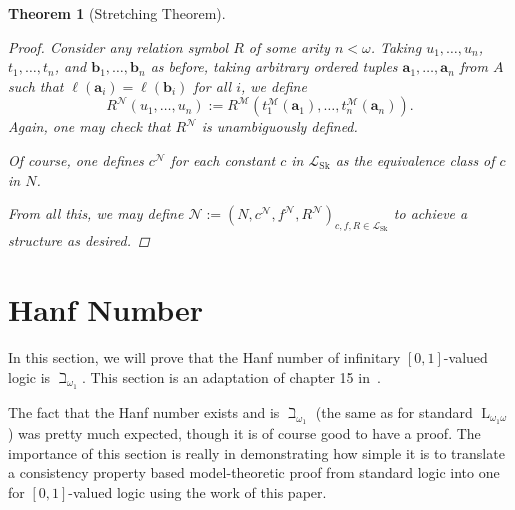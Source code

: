 \documentclass{amsart}
\newtheorem{theorem}{Theorem}[section]
\theoremstyle{definition}
\numberwithin{equation}{theorem}
\newcommand{\V}{\mathbf}
\newcommand{\len}{\ell}
\newcommand{\baselang}{\operatorname{L}}
\newcommand{\lang}{\baselang_{\omega_1\omega}}
\newcommand{\frag}{\mathcal{L}}
\newcommand{\fragsk}{\frag_{\operatorname{Sk}}}
\begin{document}
\begin{theorem}[Stretching Theorem]
\begin{proof}
    Consider any relation symbol $R$ of some arity $n<\omega$.
    Taking $u_1,\dots,u_n$, $t_1,\dots,t_n$, and $\V b_1,\dots,\V b_n$ as before,
    taking arbitrary ordered tuples $\V a_1,\dots,\V a_n$ from $A$ such that $\len(\V a_i)=\len(\V b_i)$ for all $i$, we define
    \[
      R^\mathcal N(u_1,\dots,u_n):=R^\mathcal M(t_1^\mathcal M(\V a_1),\dots,t_n^\mathcal M(\V a_n)).
    \]
    Again, one may check that $R^\mathcal N$ is unambiguously defined.
    
    Of course, one defines $c^\mathcal N$ for each constant $c$ in $\fragsk$ as the equivalence class of $c$ in $N$.
    
    From all this, we may define $\mathcal N:=(N, c^\mathcal N, f^\mathcal N,R^\mathcal N)_{c,f,R\in\fragsk}$ to achieve a structure as desired.
  \end{proof}
\end{theorem}

\section{Hanf Number}

In this section, we will prove that the Hanf number of infinitary $[0,1]$-valued logic is $\beth_{\omega_1}$.
This section is an adaptation of chapter 15 in~\cite{keisler1971model}.

The fact that the Hanf number exists and is $\beth_{\omega_1}$ (the same as for standard $\lang$) was pretty much expected, though it is of course good to have a proof.
The importance of this section is really in demonstrating how simple it is to translate a consistency property based model-theoretic proof from standard logic into one for $[0,1]$-valued logic using the work of this paper.
\end{document}
